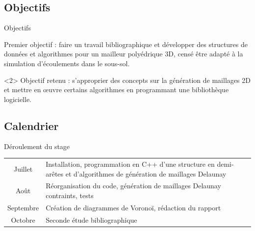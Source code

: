 \documentclass[aspectratio=169, 12pt, a4paper, hyperref={pdfauthor={Alexandre MARIN}, pdfkeywords={IFPEN, Delaunay, Voronoi, mesh generation}, colorlinks=true, linkcolor=purple, urlcolor=blue, citecolor=magenta}]{beamer}
\begin{document}
\subsection{Objectifs}
\begin{Energie}{Objectifs}

Premier objectif : faire un travail bibliographique et développer des structures de données et algorithmes pour un mailleur polyédrique 3D, censé être adapté à la simulation d'écoulements dans le sous-sol.
\\[1cm]
\begin{visibleenv}<2>
Objectif retenu : s'approprier des concepts sur la génération de maillages 2D et mettre en \oe{}uvre certains algorithmes en programmant une bibliothèque logicielle.
\end{visibleenv}
\end{Energie}

\subsection{Calendrier}
\begin{Energie}{Déroulement du stage}
{\renewcommand{\arraystretch}{1.5}
\renewcommand{\tabcolsep}{0.2cm}
\begin{tabular}{c|p{12cm}}
Juillet & Installation, programmation en C++ d'une structure en demi-arêtes et d'algorithmes de génération de maillages Delaunay\\
Août & Réorganisation du code, génération de maillages Delaunay contraints, tests\\
Septembre & Création de diagrammes de Voronoï, rédaction du rapport\\
Octobre & Seconde étude bibliographique\\
\end{tabular}}
\end{Energie}
\end{document}
